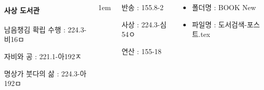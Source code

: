 \documentclass[	20pt, 
							a1paper, 
							portrait, %
							margin=0mm, %
							innermargin=10mm,  		%
							blockverticalspace=4mm, %
							colspace=5mm, 
							subcolspace=0mm
							]{tikzposter}
\begin{document}
\begin{columns}
{\begin{LARGE}
		\paragraph{사상 도서관}

		남음챙김 확립 수행 : 224.3-비16ㅁ

		자비와 공 : 221.1-아192ㅈ

		명상가 붓다의 삶 : 224.3-아192ㅁ

				\end{LARGE}
			} %


			{
					\setlength{\leftmargini}{4em}
					\setlength{\labelsep} {1em}
				\begin{LARGE}
반송  : 155.8-2  %

사상  :  224.3-심54ㅇ %

연산  :  155-18    %



				\end{LARGE}
			}

			{
				\begin{LARGE}
					\begin{itemize}
					\item 폴더명 : BOOK New
					\item 파일명 : 도서검색-포스트.tex
					\end{itemize}
				\end{LARGE}
			}


	\end{columns}
\end{document}
